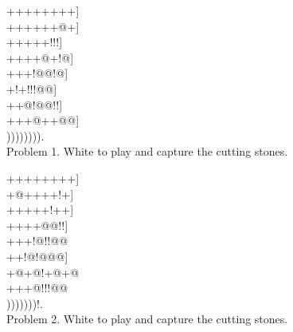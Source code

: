 \documentclass[mcrownvopaper,10pt,twopage,onecolumn,final]{memoir}
\begin{document}
\begin{figure}[ht]
    \begin{minipage}[c]{0.5\linewidth}
        \centering    
        {\gnos%
        ++++++++]\\
        ++++++@+]\\
        +++++!!!]\\
        ++++@+!@]\\
        +++!@@!@]\\
        +!+!!!@@]\\
        ++@!@@!!]\\
        +++@++@@]\\
        )))))))).\\
        }
        Problem 1. White to play and capture the cutting stones.
    \end{minipage}%
    \begin{minipage}[c]{0.5\linewidth}
        \centering    
        {\gnos%
        ++++++++]\\
        +@++++!+]\\
        +++++!++]\\
        ++++@@!!]\\
        +++!@!!@@\\
        ++!@!@@@]\\
        +@+@!+@+@\\
        +++@!!!@@\\
        )))))))!.\\
        }
        Problem 2. White to play and capture the cutting stones.
    \end{minipage}
\end{figure}
\end{document}
